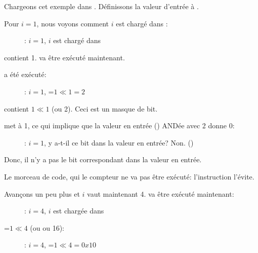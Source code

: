 ﻿\clearpage
\mysubparagraph{\olly}
\myindex{\olly}

Chargeons cet exemple dans \olly.
Définissons la valeur d'entrée à .

Pour $i=1$, nous voyons comment $i$ est chargé dans \ECX:

\begin{figure}[H]
\centering
{}
\caption{\olly: $i=1$, $i$ est chargé dans \ECX}
\label{fig:shifts_olly1_1}
\end{figure}

\EDX contient 1. \SHL va être exécuté maintenant.

\clearpage
\SHL a été exécuté:

\begin{figure}[H]
\centering
{}
\caption{\olly: $i=1$, \EDX=$1 \ll 1=2$}
\label{fig:shifts_olly1_2}
\end{figure}

\EDX contient $1 \ll 1$ (ou 2). Ceci est un masque de bit.

\clearpage
\AND met \ZF à 1, ce qui implique que la valeur en entrée () ANDée
avec 2 donne 0:

\begin{figure}[H]
\centering
{}
\caption{\olly: $i=1$, 
y a-t-il ce bit dans la valeur en entrée? Non. ()}
\label{fig:shifts_olly1_3}
\end{figure}

Donc, il n'y a pas le bit correspondant dans la valeur en entrée.

Le morceau de code, qui  le compteur ne va pas être
exécuté:
l'instruction \JZ l'évite.

\clearpage
Avançons un peu plus et $i$ vaut maintenant 4.
\SHL va être exécuté maintenant:

\begin{figure}[H]
\centering
{}
\caption{\olly: $i=4$, $i$ est chargée dans \ECX}
\label{fig:shifts_olly4_1}
\end{figure}

\clearpage
\EDX=$1 \ll 4$ (ou  ou 16):

\begin{figure}[H]
\centering
{}
\caption{\olly: $i=4$, \EDX=$1 \ll 4=0x10$}
\label{fig:shifts_olly4_2}
\end{figure}

